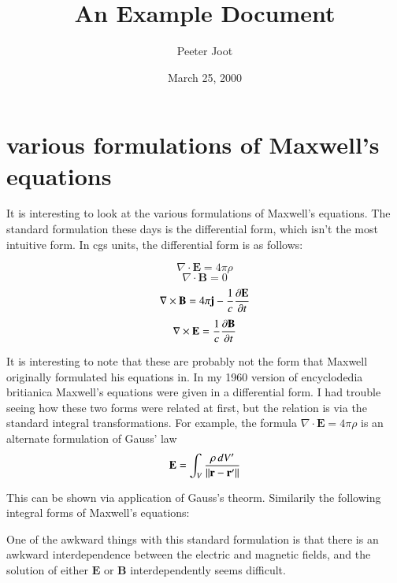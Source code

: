 \documentclass{article}      %
\title{An Example Document}  %
\author{Peeter Joot}         %
\date{March 25, 2000}        %
\newcommand{\norm}[1]{\lVert#1\rVert}
\newcommand{\Curl}[1]{\nabla \times \mathbf{#1}}
\newcommand{\Diverg}[1]{\nabla \cdot \mathbf{#1}}
\newcommand{\Ddt}[1]{ {{\partial{\mathbf{#1}}} \over {\partial{t}}}}
\newcommand{\Bj}[0]{\mathbf{j}}
\newcommand{\BB}[0]{\mathbf{B}}
\newcommand{\BE}[0]{\mathbf{E}}
\begin{document}


\section{various formulations of Maxwell's equations}

It is interesting to look at the various formulations of Maxwell's 
equations.  The standard formulation these days is the differential
form, which isn't the most intuitive form.  In cgs units, the differential
form is as follows:

\begin{equation*}
\Diverg E = 4\pi\rho
\end{equation*}
\begin{equation*}
\Diverg B = 0
\end{equation*}
\begin{equation*}
\Curl{B} = 4\pi \Bj - {1 \over c} \Ddt{E}
\end{equation*}
\begin{equation*}
\Curl{E} = {1 \over c} \Ddt{B}
\end{equation*}

It is interesting to note that these are probably not the form that Maxwell 
originally formulated his equations in.  In my 1960 version of encyclodedia 
britianica Maxwell's equations were given in a differential form.  I had 
trouble seeing how these two forms were related at first, but the relation
is via the standard integral transformations.  For example, the formula $\Diverg E = 4\pi\rho$ is an alternate formulation of Gauss' law
\begin{equation*}
\BE = \int_V{{\rho\,dV' \over \norm{\mathbf r - \mathbf r'}}}
\end{equation*}

This can be shown via application of Gauss's theorm.  Similarily the following 
integral forms of Maxwell's equations:


One of the awkward things with this standard formulation is that there 
is an awkward interdependence between the electric and magnetic fields, and 
the solution of either $\BE$ or $\BB$ interdependently seems difficult.
\end{document}
